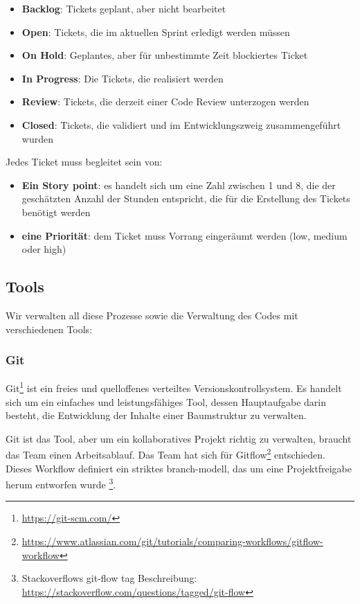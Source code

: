 \begin{itemize}
  \item \textbf{Backlog}: Tickets geplant, aber nicht bearbeitet
  \item \textbf{Open}: Tickets, die im aktuellen Sprint erledigt werden müssen
  \item \textbf{On Hold}: Geplantes, aber für unbestimmte Zeit blockiertes Ticket
  \item \textbf{In Progress}: Die Tickets, die realisiert werden
  \item \textbf{Review}: Tickets, die derzeit einer Code Review unterzogen werden
  \item \textbf{Closed}: Tickets, die validiert und im Entwicklungszweig zusammengeführt wurden
\end{itemize}

Jedes Ticket muss begleitet sein von:
\begin{itemize}
  \item \textbf{Ein Story point}: es handelt sich um eine Zahl zwischen 1 und 8, die der geschätzten Anzahl der Stunden entspricht, die für die Erstellung des Tickets benötigt werden
  \item \textbf{eine Priorität}: dem Ticket muss Vorrang eingeräumt werden (low, medium oder high)
\end{itemize}



\subsection{Tools}

Wir verwalten all diese Prozesse sowie die Verwaltung des Codes mit verschiedenen Tools:

\subsubsection{Git}

Git\footnote{\href{https://git-scm.com/}{https://git-scm.com/}} ist ein freies und quelloffenes verteiltes Versionskontrollsystem.
Es handelt sich um ein einfaches und leistungsfähiges Tool, dessen Hauptaufgabe darin besteht, die Entwicklung der Inhalte einer Baumstruktur zu verwalten.

Git ist das Tool, aber um ein kollaboratives Projekt richtig zu verwalten, braucht das Team einen Arbeitsablauf.
Das Team hat sich für Gitflow\footnote{\href{https://www.atlassian.com/git/tutorials/comparing-workflows/gitflow-workflow}{https://www.atlassian.com/git/tutorials/comparing-workflows/gitflow-workflow}} entschieden. Dieses Workflow definiert ein striktes branch-modell, das um eine Projektfreigabe herum entworfen wurde
\footnote{Stackoverflows git-flow tag Beschreibung: \href{https://stackoverflow.com/questions/tagged/git-flow}{https://stackoverflow.com/questions/tagged/git-flow}}.

